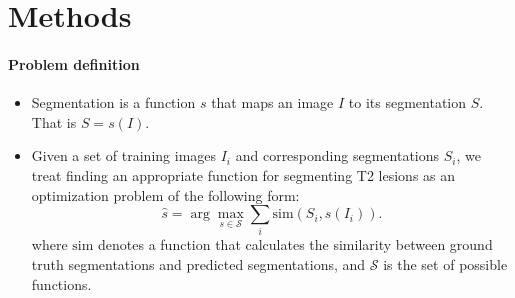 \section{Methods}
\label{sec:method}

\paragraph{Problem definition}
\begin{itemize}

\item Segmentation is a function $s$ that maps an image $I$ to its segmentation
$S$. That is $S = s(I)$.

\item Given a set of training images $I_i$ and corresponding segmentations
$S_i$, we treat finding an appropriate function for segmenting T2 lesions as an
optimization problem of the following form:
 \begin{equation} 
\hat{s} = \arg \max_{s \in \mathcal{S}} \sum_i \text{sim}(S_i, s(I_i)).
\label{eq:segprob}
\end{equation}
where $\text{sim}$ denotes a function that calculates the similarity between
ground truth segmentations and predicted segmentations, and $\mathcal{S}$ is the
set of possible functions.
\end{itemize}

